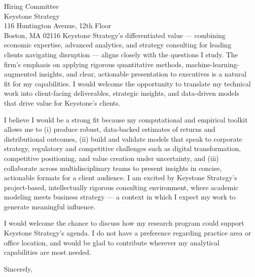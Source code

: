 \documentclass[11pt,letterpaper]{letter}
\begin{document}
\begin{letter}{Hiring Committee \\
Keystone Strategy \\
116 Huntington Avenue, 12th Floor \\
Boston, MA 02116}
Keystone Strategy’s differentiated value — combining economic expertise, advanced analytics, and strategy consulting for leading clients navigating disruption — aligns closely with the questions I study. The firm’s emphasis on applying rigorous quantitative methods, machine-learning-augmented insights, and clear, actionable presentation to executives is a natural fit for my capabilities. I would welcome the opportunity to translate my technical work into client-facing deliverables, strategic insights, and data-driven models that drive value for Keystone’s clients.

I believe I would be a strong fit because my computational and empirical toolkit allows me to (i) produce robust, data-backed estimates of returns and distributional outcomes, (ii) build and validate models that speak to corporate strategy, regulatory and competitive challenges such as digital transformation, competitive positioning, and value creation under uncertainty, and (iii) collaborate across multidisciplinary teams to present insights in concise, actionable formats for a client audience. I am excited by Keystone Strategy’s project-based, intellectually rigorous consulting environment, where academic modeling meets business strategy — a context in which I expect my work to generate meaningful influence.

I would welcome the chance to discuss how my research program could support Keystone Strategy’s agenda. I do not have a preference regarding practice area or office location, and would be glad to contribute wherever my analytical capabilities are most needed.

\closing{Sincerely,}

\end{letter}
\end{document}
